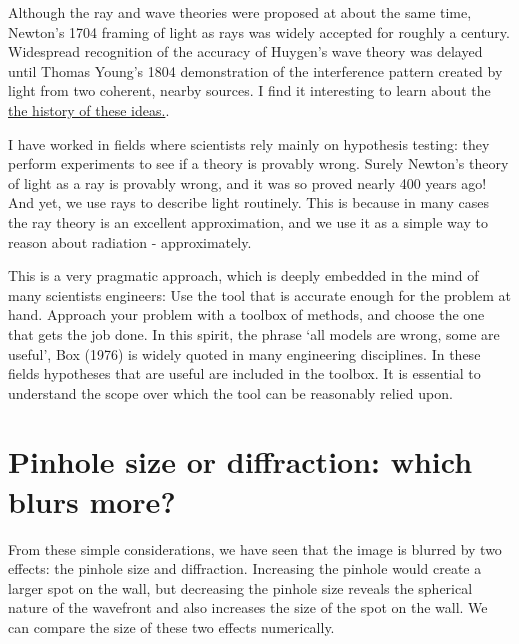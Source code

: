 \documentclass[
  letterpaper,
]{book}
\begin{document}
\begin{tcolorbox}[enhanced jigsaw, opacitybacktitle=0.6, breakable, bottomtitle=1mm, leftrule=.75mm, colframe=quarto-callout-note-color-frame, colback=white, left=2mm, opacityback=0, title=\textcolor{quarto-callout-note-color}{\faInfo}\hspace{0.5em}{Rays and waves and hypotheses}, toptitle=1mm, bottomrule=.15mm, titlerule=0mm, arc=.35mm, colbacktitle=quarto-callout-note-color!10!white, toprule=.15mm, rightrule=.15mm, coltitle=black]

Although the ray and wave theories were proposed at about the same time,
Newton's 1704 framing of light as rays was widely accepted for roughly a
century. Widespread recognition of the accuracy of Huygen's wave theory
was delayed until Thomas Young's 1804 demonstration of the interference
pattern created by light from two coherent, nearby sources. I find it
interesting to learn about the
\href{../resources/optics-diffraction.html}{the history of these
ideas.}.

I have worked in fields where scientists rely mainly on hypothesis
testing: they perform experiments to see if a theory is provably wrong.
Surely Newton's theory of light as a ray is provably wrong, and it was
so proved nearly 400 years ago! And yet, we use rays to describe light
routinely. This is because in many cases the ray theory is an excellent
approximation, and we use it as a simple way to reason about radiation -
approximately.

This is a very pragmatic approach, which is deeply embedded in the mind
of many scientists engineers: Use the tool that is accurate enough for
the problem at hand. Approach your problem with a toolbox of methods,
and choose the one that gets the job done. In this spirit, the phrase
`all models are wrong, some are useful', Box (1976) is widely quoted in
many engineering disciplines. In these fields hypotheses that are useful
are included in the toolbox. It is essential to understand the scope
over which the tool can be reasonably relied upon.

\end{tcolorbox}

\section{Pinhole size or diffraction: which blurs
more?}\label{sec-airy-pattern}

From these simple considerations, we have seen that the image is blurred
by two effects: the pinhole size and diffraction. Increasing the pinhole
would create a larger spot on the wall, but decreasing the pinhole size
reveals the spherical nature of the wavefront and also increases the
size of the spot on the wall. We can compare the size of these two
effects numerically.
\end{document}
